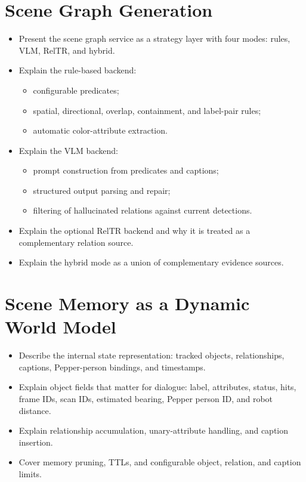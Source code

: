 \section{Scene Graph Generation}
\begin{itemize}
    \item Present the scene graph service as a strategy layer with four modes: rules, VLM, RelTR, and hybrid.
    \item Explain the rule-based backend:
    \begin{itemize}
        \item configurable predicates;
        \item spatial, directional, overlap, containment, and label-pair rules;
        \item automatic color-attribute extraction.
    \end{itemize}
    \item Explain the VLM backend:
    \begin{itemize}
        \item prompt construction from predicates and captions;
        \item structured output parsing and repair;
        \item filtering of hallucinated relations against current detections.
    \end{itemize}
    \item Explain the optional RelTR backend and why it is treated as a complementary relation source.
    \item Explain the hybrid mode as a union of complementary evidence sources.
\end{itemize}

\section{Scene Memory as a Dynamic World Model}
\begin{itemize}
    \item Describe the internal state representation: tracked objects, relationships, captions, Pepper-person bindings, and timestamps.
    \item Explain object fields that matter for dialogue: label, attributes, status, hits, frame IDs, scan IDs, estimated bearing, Pepper person ID, and robot distance.
    \item Explain relationship accumulation, unary-attribute handling, and caption insertion.
    \item Cover memory pruning, TTLs, and configurable object, relation, and caption limits.
\end{itemize}


